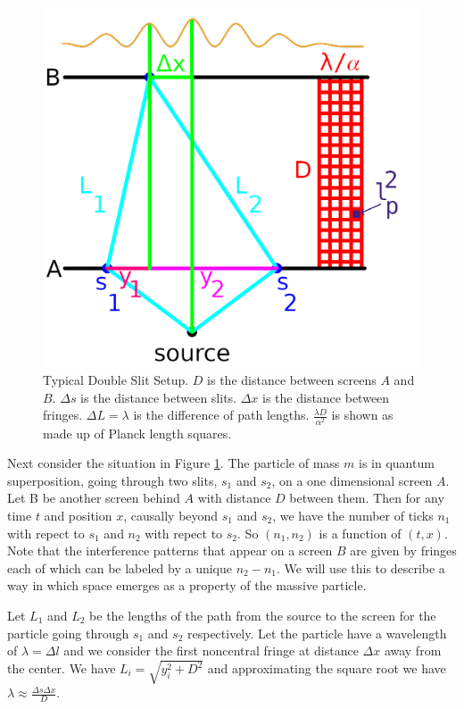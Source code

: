 \documentclass[12pt,a4paper]{article}
\begin{document}
\begin{figure}[h!]
\centering
\includegraphics[scale=0.5]{double_slit.png}
\caption{Typical Double Slit Setup.  $D$ is the distance between screens $A$ and $B$. $\Delta s$ is the distance between slits.  $\Delta x$ is the distance between fringes. $\Delta L = \lambda$ is the difference of path lengths.  $\frac{\lambda D}{\alpha^2}$ is shown as made up of Planck length squares.}
\label{screen}
\end{figure}


Next consider the situation in Figure \ref{screen}.  The particle of mass $m$ is in quantum superposition, going through two slits, $s_1$ and $s_2$, on a one dimensional screen $A$. Let B be another screen behind $A$ with distance $D$ between them. Then for any time $t$ and position $x$, causally beyond $s_1$ and $s_2$, we have the number of ticks $n_1$ with repect to $s_1$ and $n_2$ with repect to $s_2$. So $(n_1,n_2)$ is a function of $(t,x)$. Note that the interference patterns that appear on a screen $B$ are given by fringes each of which can be labeled by a unique $n_2 - n_1$. We will use this to describe a way in which space emerges as a property of the massive particle. 

Let $L_1$ and $L_2$ be the lengths of the path from the source to the screen for the particle going through $s_1$ and $s_2$ respectively. Let the particle have a wavelength of $\lambda = \Delta l$ and we consider the first noncentral fringe at distance $\Delta x$ away from the center.  We have $L_i = \sqrt{y_i^2 + D^2}$ and approximating the square root we have $\lambda \approx \frac{\Delta s \Delta x}{D}$.
\end{document}
